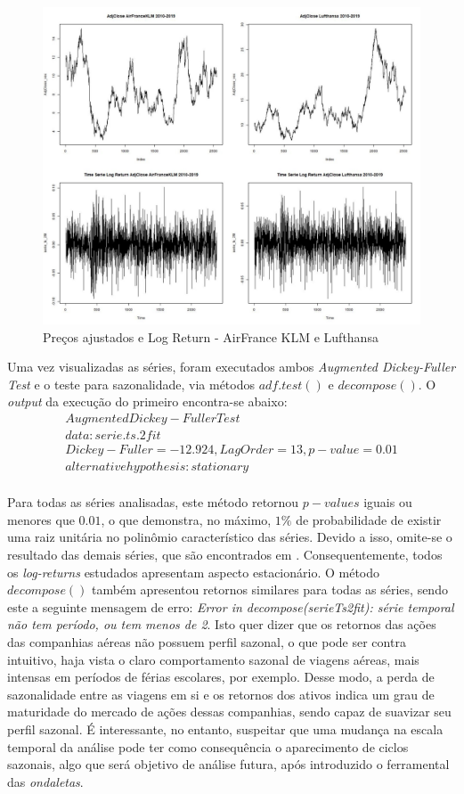 \documentclass[12pt]{article}
\begin{document}
\begin{figure}[H]
	\centering
	\includegraphics[width=0.8\linewidth]{../Modelos/SeriesCompEuropa10_19}
	\caption{Preços ajustados e Log Return - AirFrance KLM e Lufthansa}
	\label{fig:seriescompeuropa1019}
\end{figure}

Uma vez visualizadas as séries, foram executados ambos \textit{Augmented Dickey-Fuller Test} e o teste para sazonalidade, via métodos $adf.test()$ e $decompose()$. O \textit{output} da execução do primeiro encontra-se abaixo:
\begin{gather*}
Augmented Dickey-Fuller Test\\
data:  serie.ts.2fit\\
Dickey-Fuller = -12.924, Lag Order = 13, p-value = 0.01\\
alternative hypothesis: stationary\\
\end{gather*}

Para todas as séries analisadas, este método retornou $ p-values $ iguais ou menores que $0.01$, o que demonstra, no máximo, $1\%$ de probabilidade de existir uma raiz unitária no polinômio característico das séries. Devido a isso, omite-se o resultado das demais séries, que são encontrados em \cite{git}. Consequentemente, todos os \textit{log-returns} estudados apresentam aspecto estacionário. O método $decompose()$ também apresentou retornos similares para todas as séries, sendo este a seguinte mensagem de erro: \emph{Error in decompose(serieTs2fit): série temporal não tem período, ou tem menos de 2}. Isto quer dizer que os retornos das ações das companhias aéreas não possuem perfil sazonal, o que pode ser contra intuitivo, haja vista o claro comportamento sazonal de viagens aéreas, mais intensas em períodos de férias escolares, por exemplo. Desse modo, a perda de sazonalidade entre as viagens em si e os retornos dos ativos indica um grau de maturidade do mercado de ações dessas companhias, sendo capaz de suavizar seu perfil sazonal. É interessante, no entanto, suspeitar que uma mudança na escala temporal da análise pode ter como consequência o aparecimento de ciclos sazonais, algo que será objetivo de análise futura, após introduzido o ferramental das \emph{ondaletas}. 
\end{document}
